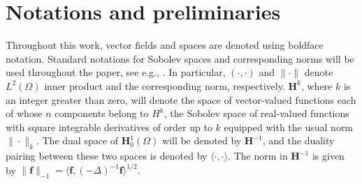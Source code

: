 \documentclass[3p]{elsarticle}
\def\V#1{\mathbf{#1}}
\begin{document}
\section{Notations and preliminaries}\label{sec:Notations}
Throughout this work, vector fields and spaces are denoted using boldface notation.
\noindent Standard notations for Sobolev spaces and corresponding norms will be used throughout the paper, see e.g., \cite{Ada1975}. In particular, $(\cdot,\cdot)$ and $\|\cdot \|$ denote $L^2(\Omega)$ inner product and the corresponding norm, respectively. $\V{H}^{k}$, where $k$ is an integer greater than zero, will denote the space of vector-valued functions each of whose $n$ components belong to $H^k$, the Sobolev space of real-valued functions with square integrable derivatives of order up to $k$ equipped with the usual norm $\|\cdot\|_k$. The dual space of $\V{H}^{1}_0(\Omega)$ will be denoted by $\V{H}^{-1}$, and the duality pairing between these two spaces is denoted by $\langle \cdot,\cdot \rangle$. The norm in 
$\V{H}^{-1}$ is given by $\|\V{f} \|_{-1} = \langle \V{f}, (-\Delta )^{-1}\V{f} \rangle^{1/2}.$
\end{document}
